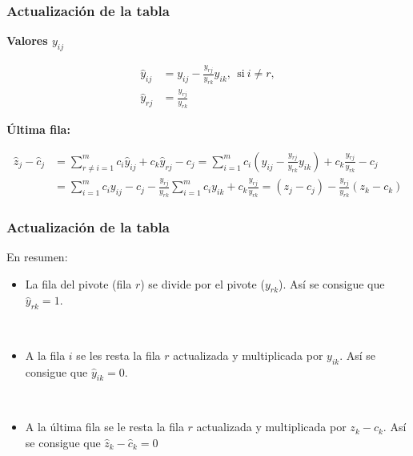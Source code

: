 \documentclass{beamer}
\begin{document}
\begin{frame}
\frametitle{Actualización de la tabla}


\textbf{Valores $y_{ij}$}

\begin{align*}
\hat{y}_{ij} &= y_{ij} - \frac{y_{rj}}{y_{rk}}y_{ik}, \ \ \mbox{si}\ i\neq r, \\
\hat{y}_{rj} &= \frac{y_{rj}}{y_{rk}}
\end{align*} 

\textbf{Última fila:}

\begin{align*}
\hat{z}_j - \hat{c}_j &= \sum_{r\neq i=1}^m c_i \hat{y}_{ij} + c_k\hat{y}_{rj} - c_j=
\sum_{i=1}^m c_i \left(y_{ij} - \frac{y_{rj}}{y_{rk}}y_{ik}\right) + c_k\frac{y_{rj}}{y_{rk}} - c_j \\
&= \sum_{i=1}^m c_i y_{ij} - c_j -  \frac{y_{rj}}{y_{rk}} \sum_{i=1}^m c_i y_{ik} + c_k\frac{y_{rj}}{y_{rk}} = (z_j-c_j) - \frac{y_{rj}}{y_{rk}} (z_k-c_k)
\end{align*}


\end{frame}
\begin{frame}
\frametitle{Actualización de la tabla}

En resumen:

\begin{itemize}
\item La fila del pivote (fila $r$) se divide por el pivote ($y_{rk}$). Así se consigue que $\hat{y}_{rk}=1$.

\

\item A la fila $i$ se les resta la fila  $r$ actualizada y multiplicada por $y_{ik}$. Así se consigue que $\hat{y}_{ik}=0$.

\

\item A la última fila se le resta la fila  $r$ actualizada y multiplicada por $z_k-c_k$. Así se consigue que $\hat{z}_k - \hat{c}_k=0$
\end{itemize}


\end{frame}
\end{document}
